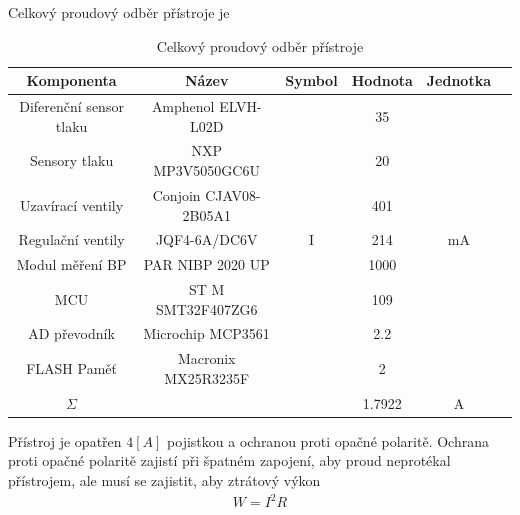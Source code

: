 Celkový proudový odběr přístroje je
\begin{table}[H]
    \label{tab:sum_of_current}
    \caption{Celkový proudový odběr přístroje}
    \hspace*{-1.2cm}
    \begin{ctucolortab}
        \begin{tabular}{cccccc}
            \toprule
            Komponenta              & Název                 & Symbol & Hodnota & Jednotka \\ \midrule
            Diferenční sensor tlaku & Amphenol ELVH-L02D    &        & 35      &          \\
            Sensory tlaku           & NXP MP3V5050GC6U      &        & 20      &          \\
            Uzavírací ventily       & Conjoin CJAV08-2B05A1 &        & 401     &          \\
            Regulační ventily       & JQF4-6A/DC6V          & I      & 214     & mA       \\
            Modul měření BP         & PAR NIBP 2020 UP      &        & 1000    &          \\
            MCU                     & ST M SMT32F407ZG6     &        & 109     &          \\
            AD převodník            & Microchip MCP3561     &        & 2.2     &          \\
            FLASH Paměť             & Macronix MX25R3235F   &        & 2       &          \\
            \bottomrule
            $\Sigma$                &                       &        & 1.7922  & A        \\
            \bottomrule
        \end{tabular}
    \end{ctucolortab}
\end{table}

Přístroj je opatřen $4 [A]$ pojistkou a ochranou proti opačné polaritě.
Ochrana proti opačné polaritě zajistí při špatném zapojení, aby proud neprotékal přístrojem, ale musí se zajistit, aby ztrátový výkon
\begin{align*}
    W = I^2 R
\end{align*}

